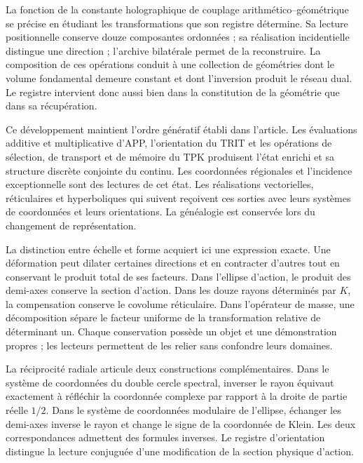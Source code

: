 \label{rec:apertura}

La fonction de la constante holographique de couplage arithmético--géométrique se précise en étudiant les transformations que son registre détermine. Sa lecture positionnelle conserve douze composantes ordonnées ; sa réalisation incidentielle distingue une direction ; l’archive bilatérale permet de la reconstruire. La composition de ces opérations conduit à une collection de géométries dont le volume fondamental demeure constant et dont l’inversion produit le réseau dual. Le registre intervient donc aussi bien dans la constitution de la géométrie que dans sa récupération.

Ce développement maintient l’ordre génératif établi dans l’article. Les évaluations additive et multiplicative d’APP, l’orientation du TRIT et les opérations de sélection, de transport et de mémoire du TPK produisent l’état enrichi et sa structure discrète conjointe du continu. Les coordonnées régionales et l’incidence exceptionnelle sont des lectures de cet état. Les réalisations vectorielles, réticulaires et hyperboliques qui suivent reçoivent ces sorties avec leurs systèmes de coordonnées et leurs orientations. La généalogie est conservée lors du changement de représentation.

La distinction entre échelle et forme acquiert ici une expression exacte. Une déformation peut dilater certaines directions et en contracter d’autres tout en conservant le produit total de ses facteurs. Dans l’ellipse d’action, le produit des demi-axes conserve la section d’action. Dans les douze rayons déterminés par \(K\), la compensation conserve le covolume réticulaire. Dans l’opérateur de masse, une décomposition sépare le facteur uniforme de la transformation relative de déterminant un. Chaque conservation possède un objet et une démonstration propres ; les lecteurs permettent de les relier sans confondre leurs domaines.


La réciprocité radiale articule deux constructions complémentaires. Dans le système de coordonnées du double cercle spectral, inverser le rayon équivaut exactement à réfléchir la coordonnée complexe par rapport à la droite de partie réelle \(1/2\). Dans le système de coordonnées modulaire de l’ellipse, échanger les demi-axes inverse le rayon et change le signe de la coordonnée de Klein. Les deux correspondances admettent des formules inverses. Le registre d’orientation distingue la lecture conjuguée d’une modification de la section physique d’action.

